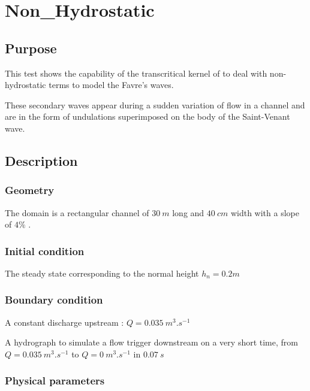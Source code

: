 \chapter{Non\_Hydrostatic}
%


\section{Purpose}
This test shows the capability of the transcritical kernel of \mascaret to deal with non-hydrostatic terms to model the Favre's waves.

These secondary waves appear during a sudden variation of flow in a channel and are in the form of undulations superimposed on the body of the Saint-Venant wave.

\section{Description}

\subsection{Geometry}

The domain is a rectangular channel of $30\ m$ long and $40\ cm$ width with a slope of $4\%$ .

\subsection{Initial condition}

The steady state corresponding to the normal height $h_n = 0.2 m$

\subsection{Boundary condition}

A constant discharge upstream : $ Q = 0.035\ m^{3}.s^{-1} $

A hydrograph to simulate a flow trigger downstream on a very short time, from $ Q = 0.035\ m^{3}.s^{-1} $ to $ Q = 0\ m^{3}.s^{-1} $ in $ 0.07\ s $


\subsection{Physical parameters}

